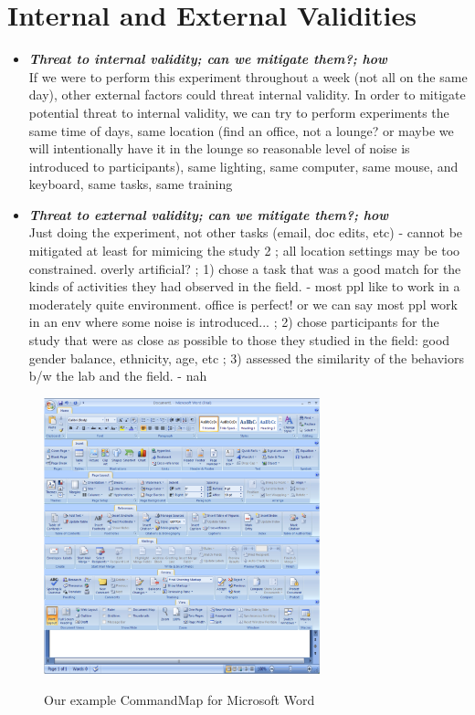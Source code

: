 \documentclass{article}
\begin{document}
\section*{Internal and External Validities}  
\begin{itemize}
   \item \textbf{\textit{Threat to internal validity; can we mitigate them?; how}} \\
   If we were to perform this experiment throughout a week (not all on the same day), other external factors could threat internal validity. In order to mitigate potential threat to internal validity, we can try to perform experiments the same time of days, same location (find an office, not a lounge? or maybe we will intentionally have it in the lounge so reasonable level of noise is introduced to participants), same lighting,  same computer, same mouse, and keyboard, same tasks, same training
   \item \textbf{\textit{Threat to external validity; can we mitigate them?; how}} \\
   Just doing the experiment, not other tasks (email, doc edits, etc) - cannot be mitigated at least for mimicing the study 2
;	all location settings may be too constrained. overly artificial?
;	1) chose a task that was a good match for the kinds of activities they had observed in the field. - most ppl like to work in a moderately quite environment. office is perfect! or we can say most ppl work in an env where some noise is introduced...
;	2) chose participants for the study that were as close as possible to those they studied in the field: good gender balance, ethnicity, age, etc
;	3) assessed the similarity of the behaviors b/w the lab and the field. - nah 
\end{itemize} 
 
\begin{figure}[tbh]
  \centering
  \includegraphics[width=80mm]{command_layout1}\\
  \caption{Our example CommandMap for Microsoft Word}
  \label{fig:ex_commandmap}
\end{figure}
\end{document}
